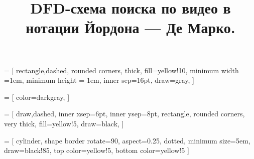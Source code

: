 \documentclass{.local/lib/classes/ndvr-vector-image-standalone}
\title[NDVR thesis-abstract]{%
    DFD-схема поиска по видео в нотации Йордона — Де Марко.%
}
\begin{document}
    \newcommand{\DFDFunction}{%
        \stepcounter{DFDFunction}%
        {\small\textsf{(Функция~\arabic{DFDFunction})}}%
    }

    \newcommand{\DFDStorage}{%
        \stepcounter{DFDStorage}%
        {\small\textsf{(Хранилище~\arabic{DFDStorage})}}%
    }

    \newcommand{\DFDBlock}{%
        \stepcounter{DFDBlock}%
        {\textsf{\arabic{DFDBlock}}}%
    }

    \makeatletter
    \makeatother

     = [
        rectangle,dashed,
        rounded corners,
        thick,
        fill=yellow!10,
        minimum width =1em,
        minimum height = 1em,
        inner sep=16pt,
        draw=gray,
    ]

     = [
        color=darkgray,
    ]

     = [
        draw,dashed,
        inner xsep=6pt,
        inner ysep=8pt,
        rectangle,
        rounded corners,
        very thick,
        fill=yellow!5,
        draw=black,
    ]

     = [
        cylinder,
        shape border rotate=90,
        aspect=0.25,
        dotted,
        minimum size=5em,
        draw=black!85,
        top color=yellow!5,
        bottom color=yellow!5
    ]
\end{document}
